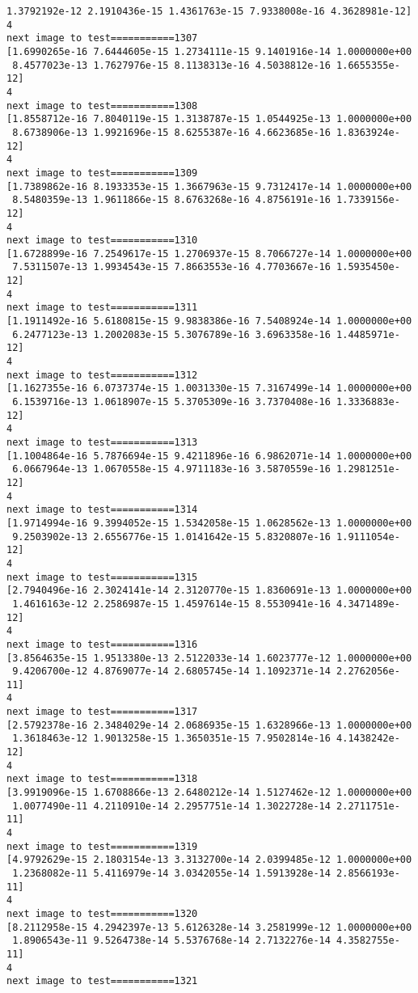 \documentclass[11pt]{article}
\begin{document}
\begin{Verbatim}[commandchars=\\\{\}]
 1.3792192e-12 2.1910436e-15 1.4361763e-15 7.9338008e-16 4.3628981e-12]
4
next image to test===========1307
[1.6990265e-16 7.6444605e-15 1.2734111e-15 9.1401916e-14 1.0000000e+00
 8.4577023e-13 1.7627976e-15 8.1138313e-16 4.5038812e-16 1.6655355e-12]
4
next image to test===========1308
[1.8558712e-16 7.8040119e-15 1.3138787e-15 1.0544925e-13 1.0000000e+00
 8.6738906e-13 1.9921696e-15 8.6255387e-16 4.6623685e-16 1.8363924e-12]
4
next image to test===========1309
[1.7389862e-16 8.1933353e-15 1.3667963e-15 9.7312417e-14 1.0000000e+00
 8.5480359e-13 1.9611866e-15 8.6763268e-16 4.8756191e-16 1.7339156e-12]
4
next image to test===========1310
[1.6728899e-16 7.2549617e-15 1.2706937e-15 8.7066727e-14 1.0000000e+00
 7.5311507e-13 1.9934543e-15 7.8663553e-16 4.7703667e-16 1.5935450e-12]
4
next image to test===========1311
[1.1911492e-16 5.6180815e-15 9.9838386e-16 7.5408924e-14 1.0000000e+00
 6.2477123e-13 1.2002083e-15 5.3076789e-16 3.6963358e-16 1.4485971e-12]
4
next image to test===========1312
[1.1627355e-16 6.0737374e-15 1.0031330e-15 7.3167499e-14 1.0000000e+00
 6.1539716e-13 1.0618907e-15 5.3705309e-16 3.7370408e-16 1.3336883e-12]
4
next image to test===========1313
[1.1004864e-16 5.7876694e-15 9.4211896e-16 6.9862071e-14 1.0000000e+00
 6.0667964e-13 1.0670558e-15 4.9711183e-16 3.5870559e-16 1.2981251e-12]
4
next image to test===========1314
[1.9714994e-16 9.3994052e-15 1.5342058e-15 1.0628562e-13 1.0000000e+00
 9.2503902e-13 2.6556776e-15 1.0141642e-15 5.8320807e-16 1.9111054e-12]
4
next image to test===========1315
[2.7940496e-16 2.3024141e-14 2.3120770e-15 1.8360691e-13 1.0000000e+00
 1.4616163e-12 2.2586987e-15 1.4597614e-15 8.5530941e-16 4.3471489e-12]
4
next image to test===========1316
[3.8564635e-15 1.9513380e-13 2.5122033e-14 1.6023777e-12 1.0000000e+00
 9.4206700e-12 4.8769077e-14 2.6805745e-14 1.1092371e-14 2.2762056e-11]
4
next image to test===========1317
[2.5792378e-16 2.3484029e-14 2.0686935e-15 1.6328966e-13 1.0000000e+00
 1.3618463e-12 1.9013258e-15 1.3650351e-15 7.9502814e-16 4.1438242e-12]
4
next image to test===========1318
[3.9919096e-15 1.6708866e-13 2.6480212e-14 1.5127462e-12 1.0000000e+00
 1.0077490e-11 4.2110910e-14 2.2957751e-14 1.3022728e-14 2.2711751e-11]
4
next image to test===========1319
[4.9792629e-15 2.1803154e-13 3.3132700e-14 2.0399485e-12 1.0000000e+00
 1.2368082e-11 5.4116979e-14 3.0342055e-14 1.5913928e-14 2.8566193e-11]
4
next image to test===========1320
[8.2112958e-15 4.2942397e-13 5.6126328e-14 3.2581999e-12 1.0000000e+00
 1.8906543e-11 9.5264738e-14 5.5376768e-14 2.7132276e-14 4.3582755e-11]
4
next image to test===========1321

\end{Verbatim}
\end{document}
